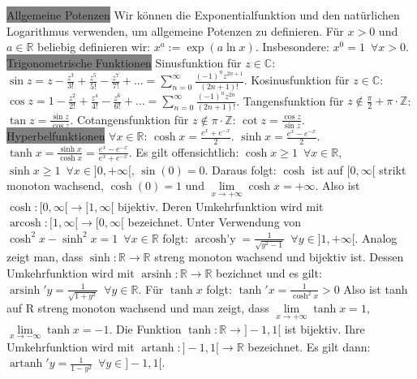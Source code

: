 \documentclass[landscape, 10pt]{article}
\newcommand{\R}{\mathbb{R}}
\newcommand{\C}{\mathbb{C}}
\begin{document}
\begin{multicols}{3}
       \colorbox{gray}{Allgemeine Potenzen} Wir können die Exponentialfunktion
              und den natürlichen Logarithmus verwenden, um 
              allgemeine Potenzen zu definieren. Für $x>0$ und
              $a\in\R$ beliebig definieren wir:
              $x^a:=\exp(a\ln x)$. 
              Insbesondere: $x^0=1\enspace\forall x>0$.\\
       \colorbox{gray}{Trigonometrische Funktionen} Sinusfunktion für $z\in\C:$
              $\sin z=z-\frac{z^3}{3!}+\frac{z^5}{5!}-\frac{z^7}{7!}+\dots
              =\sum_{n=0}^\infty\frac{(-1)^nz^{2n+1}}{(2n+1)!}$.
              Kosinusfunktion für $z\in\C:$
              $\cos z=1-\frac{z^2}{2!}+\frac{z^4}{4!}-\frac{z^6}{6!}+\dots
              =\sum_{n=0}^\infty\frac{(-1)^nz^{2n}}{(2n+1)!}$.
              Tangensfunktion für $z\notin\frac{\pi}{2}+\pi\cdot\mathbb{Z}$:
              $\tan z=\frac{\sin z}{\cos z}$. \quad
              Cotangensfunktion für $z\notin\pi\cdot\mathbb{Z}$:
              $\cot z=\frac{\cos z}{\sin z}$.\\
       \colorbox{gray}{Hyperbelfunktionen} $\forall x\in\R$:\quad
              $\cosh x=\frac{e^x+e^{-x}}{2}$.\quad
              $\sinh x=\frac{e^x-e^{-x}}{2}$.\quad
              $\tanh x=\frac{\sinh x}{\cosh x}=\frac{e^x-e^{-x}}{e^x+e^{-x}}$.
              Es gilt offensichtlich:
              $\cosh x\geqslant1\enspace\forall x\in\R$,
              $\sinh x\geqslant1\enspace\forall x\in]0,+\infty[$,
              $\sin(0)=0$. Daraus folgt: $\cosh$ ist 
              auf $[0,\infty[$ strikt
              monoton wachsend, $\cosh(0)=1$ und
              $\lim\limits_{x\to+\infty}\cosh x=+\infty$. Also ist
              $\cosh:[0,\infty[\longrightarrow[1,\infty[$ 
              bijektiv. Deren Umkehrfunktion wird mit 
              $\operatorname{arcosh}:[1,\infty[\longrightarrow[0,\infty[$ 
              bezeichnet. Unter Verwendung von
              $\cosh^2x-\sinh^2x=1\enspace\forall x\in\R$ 
              folgt:
              $\operatorname{arcosh'y}
              =\frac{1}{\sqrt{y^2-1}}\enspace\forall y\in]1,+\infty[$.
              Analog zeigt man, dass 
              $\sinh:\R\longrightarrow\R$ streng monoton
              wachsend und bijektiv ist. Dessen Umkehrfunktion 
              wird mit 
              $\operatorname{arsinh}:\R\longrightarrow\R$ 
              bezichnet und es gilt:
              $\operatorname{arsinh}'y
              =\frac{1}{\sqrt{1+y^2}}\enspace\forall y\in\R$. 
              Für $\tanh x$ folgt:
              $\tanh'x=\frac{1}{\cosh^2x}>0$ Also ist tanh auf R streng
              monoton wachsend und man zeigt, dass 
              $\lim\limits_{x\to+\infty}\tanh x=1$,
              $\lim\limits_{x\to-\infty}\tanh x=-1$.
              Die Funktion $\tanh:\R\longrightarrow]-1,1[$ ist
              bijektiv. Ihre Umkehrfunktion 
              wird mit 
              $\operatorname{artanh}:]-1,1[\longrightarrow\R$
              bezeichnet. Es gilt dann:
              $\operatorname{artanh}'y=\frac{1}{1-y^2}\enspace
              \forall y\in]-1,1[$. 



\end{multicols}
\end{document}
